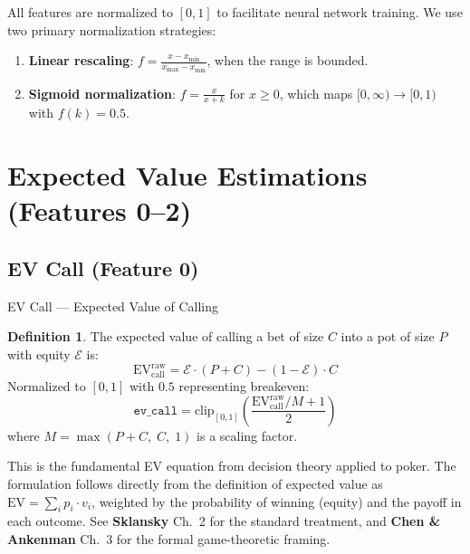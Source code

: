 \documentclass[11pt, a4paper]{article}
\theoremstyle{definition}
\newtheorem{definition}{Definition}[section]
\newcommand{\feature}[1]{\texttt{#1}}
\newcommand{\clip}[1]{\text{clip}_{[0,1]}\!\left(#1\right)}
\begin{document}
All features are normalized to $[0, 1]$ to facilitate neural network training. We use two primary normalization strategies:
\begin{enumerate}
    \item \textbf{Linear rescaling}: $f = \frac{x - x_{\min}}{x_{\max} - x_{\min}}$, when the range is bounded.
    \item \textbf{Sigmoid normalization}: $f = \frac{x}{x + k}$ for $x \geq 0$, which maps $[0, \infty) \to [0, 1)$ with $f(k) = 0.5$.
\end{enumerate}

\section{Expected Value Estimations (Features 0--2)}

\subsection{EV Call (Feature 0)}

\begin{featurebox}{EV Call --- Expected Value of Calling}
\begin{definition}
The expected value of calling a bet of size $C$ into a pot of size $P$ with equity $\mathcal{E}$ is:
\begin{equation}
    \text{EV}_{\text{call}}^{\text{raw}} = \mathcal{E} \cdot (P + C) - (1 - \mathcal{E}) \cdot C
\end{equation}
Normalized to $[0, 1]$ with $0.5$ representing breakeven:
\begin{equation}
    \feature{ev\_call} = \clip{\frac{\text{EV}_{\text{call}}^{\text{raw}} / M + 1}{2}}
\end{equation}
where $M = \max(P + C,\; C,\; 1)$ is a scaling factor.
\end{definition}
\end{featurebox}

\begin{refbox}
This is the fundamental EV equation from decision theory applied to poker. The formulation follows directly from the definition of expected value as $\text{EV} = \sum_i p_i \cdot v_i$, weighted by the probability of winning (equity) and the payoff in each outcome. See \textbf{Sklansky} \cite{sklansky1999} Ch.~2 for the standard treatment, and \textbf{Chen \& Ankenman} \cite{chen2006} Ch.~3 for the formal game-theoretic framing.
\end{refbox}
\end{document}
